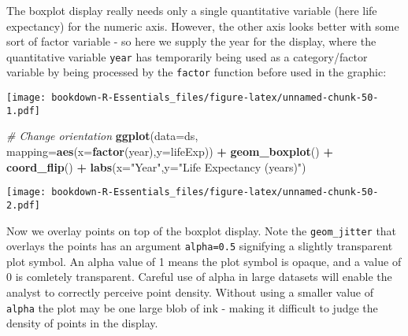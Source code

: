 \documentclass[]{book}
\newenvironment{Shaded}{\begin{snugshade}}{\end{snugshade}}
\newcommand{\KeywordTok}[1]{\textcolor[rgb]{0.13,0.29,0.53}{\textbf{#1}}}
\newcommand{\DataTypeTok}[1]{\textcolor[rgb]{0.13,0.29,0.53}{#1}}
\newcommand{\DecValTok}[1]{\textcolor[rgb]{0.00,0.00,0.81}{#1}}
\newcommand{\StringTok}[1]{\textcolor[rgb]{0.31,0.60,0.02}{#1}}
\newcommand{\CommentTok}[1]{\textcolor[rgb]{0.56,0.35,0.01}{\textit{#1}}}
\newcommand{\OperatorTok}[1]{\textcolor[rgb]{0.81,0.36,0.00}{\textbf{#1}}}
\newcommand{\NormalTok}[1]{#1}
\begin{document}
The boxplot display really needs only a single quantitative variable
(here life expectancy) for the numeric axis. However, the other axis
looks better with some sort of factor variable - so here we supply the
year for the display, where the quantitative variable \texttt{year} has
temporarily being used as a category/factor variable by being processed
by the \texttt{factor} function before used in the graphic:

\begin{Shaded}
\end{Shaded}

\texttt{[image: bookdown-R-Essentials\_files/figure-latex/unnamed-chunk-50-1.pdf]}

\begin{Shaded}
\begin{Highlighting}[]
\CommentTok{# Change orientation}
\KeywordTok{ggplot}\NormalTok{(}\DataTypeTok{data=}\NormalTok{ds, }\DataTypeTok{mapping=}\KeywordTok{aes}\NormalTok{(}\DataTypeTok{x=}\KeywordTok{factor}\NormalTok{(year),}\DataTypeTok{y=}\NormalTok{lifeExp)) }\OperatorTok{+}
\StringTok{ }\KeywordTok{geom_boxplot}\NormalTok{() }\OperatorTok{+}\StringTok{ }
\StringTok{  }\KeywordTok{coord_flip}\NormalTok{() }\OperatorTok{+}\StringTok{ }
\StringTok{  }\KeywordTok{labs}\NormalTok{(}\DataTypeTok{x=}\StringTok{"Year"}\NormalTok{,}\DataTypeTok{y=}\StringTok{"Life Expectancy (years)"}\NormalTok{)}
\end{Highlighting}
\end{Shaded}

\texttt{[image: bookdown-R-Essentials\_files/figure-latex/unnamed-chunk-50-2.pdf]}

Now we overlay points on top of the boxplot display. Note the
\texttt{geom\_jitter} that overlays the points has an argument
\texttt{alpha=0.5} signifying a slightly transparent plot symbol. An
alpha value of 1 means the plot symbol is opaque, and a value of 0 is
comletely transparent. Careful use of alpha in large datasets will
enable the analyst to correctly perceive point density. Without using a
smaller value of \texttt{alpha} the plot may be one large blob of ink -
making it difficult to judge the density of points in the display.
\end{document}
